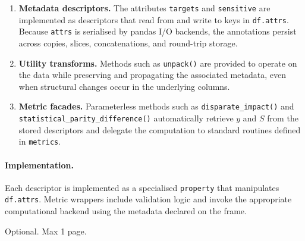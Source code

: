 \documentclass[12pt,a4paper,openright,twoside]{book}
\begin{document}
\begin{enumerate}[label=\alph*)]
  \item \textbf{Metadata descriptors.} The attributes \texttt{targets} and \texttt{sensitive} are implemented as descriptors that read from and write to keys in \texttt{df.attrs}. Because \texttt{attrs} is serialised by pandas I/O backends, the annotations persist across copies, slices, concatenations, and round-trip storage.
  \item \textbf{Utility transforms.} Methods such as \texttt{unpack()} are provided to operate on the data while preserving and propagating the associated metadata, even when structural changes occur in the underlying columns.
  \item \textbf{Metric facades.} Parameterless methods such as \texttt{disparate\_impact()} and \texttt{statistical\_parity\_difference()} automatically retrieve $y$ and $S$ from the stored descriptors and delegate the computation to standard routines defined in \texttt{metrics}.
\end{enumerate}

\paragraph{Implementation.} Each descriptor is implemented as a specialised \texttt{property} that manipulates \texttt{df.attrs}. Metric wrappers include validation logic and invoke the appropriate computational backend using the metadata declared on the frame.






\backmatter

\nocite{*} %




\begin{acknowledgements} %
Optional. Max 1 page.
\end{acknowledgements}
\end{document}
